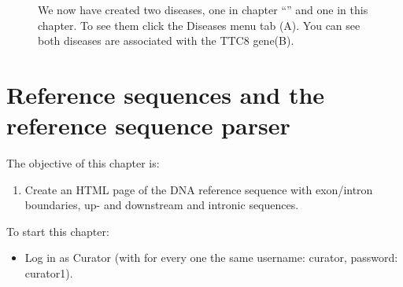 \begin{figure}[ht]
  \begin{shaded}
	  \caption{We now have created two diseases, one in chapter ``'' and one in 
	   this chapter.
	  To see them click the Diseases menu tab (A).
	  You can see both diseases are associated with the TTC8 gene(B).}
		\label{fig:create_disease_III}
  \end{shaded}
\end{figure}










\chapter{Reference sequences and the reference sequence parser}
The objective of this chapter is:
\begin{enumerate}
	\item 
	Create an HTML page of the DNA reference sequence with exon/intron boundaries, up- and downstream and 
	 intronic sequences.
\end{enumerate}
To start this chapter:
\begin{itemize}
	\item 
	Log in as Curator (with for every one the same username: curator, password: curator1).
\end{itemize}

